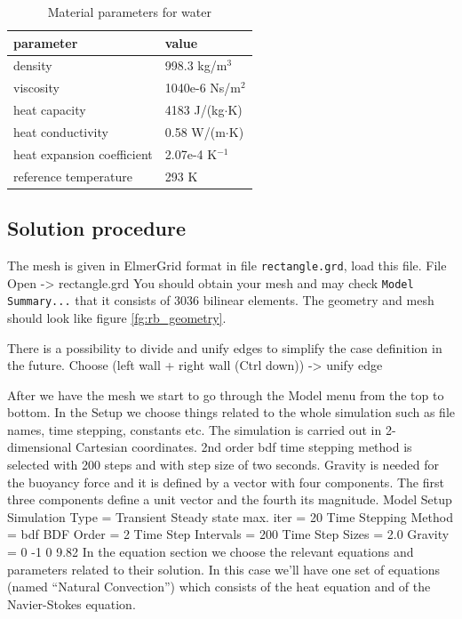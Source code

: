 \begin{table}[h]
\caption{Material parameters for water}
\label{tb:matpar}
\begin{center}
\begin{tabular}{ll} \hline
parameter  & value \\ \hline
density & 998.3 kg/m$^{3}$ \\
viscosity & 1040e-6 Ns/m$^{2}$ \\
heat capacity & 4183 J/(kg$\cdot$K) \\
heat conductivity & 0.58 W/(m$\cdot$K)       \\
heat expansion coefficient & 2.07e-4 K$^{-1}$      \\ 
reference temperature & 293 K       \\ \hline
\end{tabular}
\end{center}
\end{table}


\subsection*{Solution procedure}

The mesh is given in ElmerGrid format in file \texttt{rectangle.grd}, load this file.
\ttbegin
File 
  Open -> rectangle.grd
\ttend
You should obtain your mesh and may check \texttt{Model Summary...} that it consists 
of 3036 bilinear elements.  The geometry and mesh should look like 
figure \ref{fg:rb_geometry}.

There is a possibility to divide and unify edges to simplify the case definition in the future.
\ttbegin
Choose (left wall + right wall (Ctrl down)) -> unify edge
\ttend

After we have the mesh we start to go through the Model menu from the top to bottom. 
In the Setup we choose things related to the whole simulation such as file names, 
time stepping, constants etc.
The simulation is carried out in 2-dimensional Cartesian
coordinates. 2nd order bdf time stepping method is selected with 200 steps
and with step size of two seconds.
Gravity is needed for the buoyancy force and it is defined by a vector with four components. 
The first three components define a unit vector and the fourth its magnitude. 
\ttbegin
Model
  Setup 
    Simulation Type = Transient
    Steady state max. iter = 20
    Time Stepping Method = bdf
    BDF Order = 2
    Time Step Intervals = 200
    Time Step Sizes = 2.0
    Gravity = 0 -1 0 9.82
\ttend
In the equation section we choose the relevant equations and parameters related to their solution. 
In this case we'll have one set of equations (named ``Natural Convection'') which 
consists of the heat equation and of the Navier-Stokes equation.

